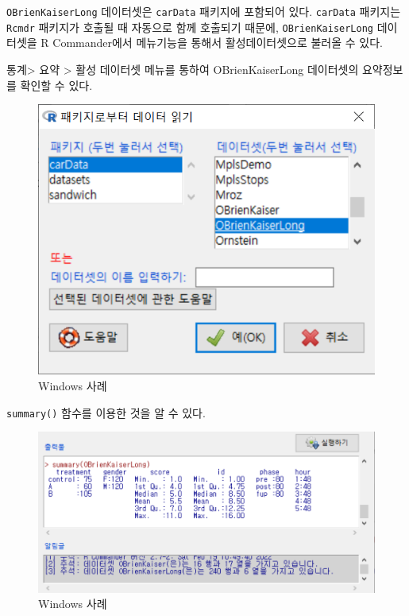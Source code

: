 \documentclass[
]{book}
\begin{document}
\texttt{OBrienKaiserLong} 데이터셋은 \texttt{carData} 패키지에 포함되어 있다.
\texttt{carData} 패키지는 \texttt{Rcmdr} 패키지가 호출될 때 자동으로 함께 호출되기 때문에, \texttt{OBrienKaiserLong} 데이터셋을 R Commander에서 메뉴기능을 통해서 활성데이터셋으로 불러올 수 있다.

통계\textgreater{} 요약 \textgreater{} 활성 데이터셋 메뉴를 통하여 OBrienKaiserLong 데이터셋의 요약정보를 확인할 수 있다.

\begin{figure}
\centering
\includegraphics{fig/dataset-obrienlong-01.png}
\caption{Windows 사례}
\end{figure}

\texttt{summary()} 함수를 이용한 것을 알 수 있다.

\begin{figure}
\centering
\includegraphics{fig/dataset-obrienlong-02.png}
\caption{Windows 사례}
\end{figure}
\end{document}
